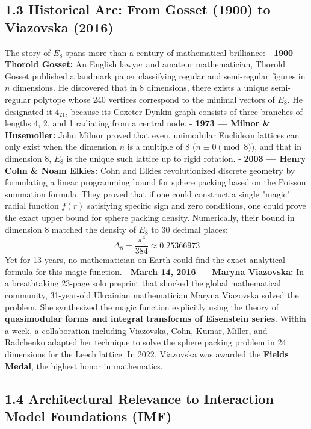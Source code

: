\documentclass[11pt,twoside,openright]{amsbook}
\begin{document}
\subsection{1.3 Historical Arc: From Gosset (1900) to Viazovska (2016)}

The story of $E_8$ spans more than a century of mathematical brilliance:
- \textbf{1900 — Thorold Gosset:} An English lawyer and amateur mathematician, Thorold Gosset published a landmark paper classifying regular and semi-regular figures in $n$ dimensions. He discovered that in 8 dimensions, there exists a unique semi-regular polytope whose 240 vertices correspond to the minimal vectors of $E_8$. He designated it $4_{21}$, because its Coxeter-Dynkin graph consists of three branches of lengths 4, 2, and 1 radiating from a central node.
- \textbf{1973 — Milnor & Husemoller:} John Milnor proved that even, unimodular Euclidean lattices can only exist when the dimension $n$ is a multiple of 8 ($n \equiv 0 \pmod 8$), and that in dimension 8, $E_8$ is the unique such lattice up to rigid rotation.
- \textbf{2003 — Henry Cohn & Noam Elkies:} Cohn and Elkies revolutionized discrete geometry by formulating a linear programming bound for sphere packing based on the Poisson summation formula. They proved that if one could construct a single "magic" radial function $f(r)$ satisfying specific sign and zero conditions, one could prove the exact upper bound for sphere packing density. Numerically, their bound in dimension 8 matched the density of $E_8$ to 30 decimal places:
$$\Delta_8 = \frac{\pi^4}{384} \approx 0.25366973$$
Yet for 13 years, no mathematician on Earth could find the exact analytical formula for this magic function.
- \textbf{March 14, 2016 — Maryna Viazovska:} In a breathtaking 23-page solo preprint that shocked the global mathematical community, 31-year-old Ukrainian mathematician Maryna Viazovska solved the problem. She synthesized the magic function explicitly using the theory of \textbf{quasimodular forms and integral transforms of Eisenstein series}. Within a week, a collaboration including Viazovska, Cohn, Kumar, Miller, and Radchenko adapted her technique to solve the sphere packing problem in 24 dimensions for the Leech lattice. In 2022, Viazovska was awarded the \textbf{Fields Medal}, the highest honor in mathematics.

\subsection{1.4 Architectural Relevance to Interaction Model Foundations (IMF)}
\end{document}
